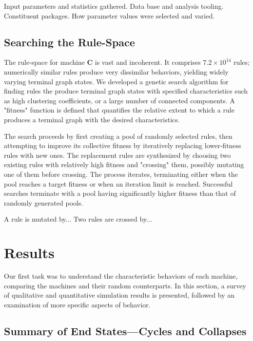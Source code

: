 \documentclass{tufte-handout}
\begin{document}
Input parameters and statistics gathered. Data base and analysis tooling.
Constituent packages. How parameter values were selected and varied.


\subsection{Searching the Rule-Space}

The rule-space for machine \textbf{C} is vast and incoherent. It comprises
$7.2 \times 10^{14}$ rules; numerically similar rules produce
very dissimilar behaviors, yielding widely varying terminal graph states.
We developed a genetic search algorithm for finding rules the produce terminal
graph states with specified characteristics such as high clustering coefficients, or
a large number of connected components. A "fitness" function is defined
that quantifies the relative extent to which a rule produces a
terminal graph with the desired characteristics.

The search proceeds by first creating a pool of randomly selected rules, then
attempting to improve its collective fitness by iteratively replacing
lower-fitness rules with new ones. The replacement rules are synthesized by
choosing two existing rules with relatively high fitness and "crossing" them,
possibly mutating one of them before crossing. The process iterates, terminating
either when the pool reaches a target fitness or when an iteration limit
is reached. Successful searches terminate with a pool having significantly
higher fitness than that of randomly generated pools.

A rule is mutated by... Two rules are crossed by...


\section{Results}

Our first task was to understand the characteristic behaviors of each
machine, comparing the machines and their random counterparts.
In this section, a survey of qualitative and quantitative simulation results is
presented, followed by an examination of more specific aspects of behavior.

\subsection{Summary of End States---Cycles and Collapses}
\end{document}
